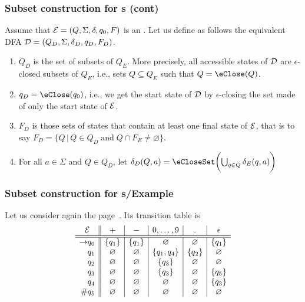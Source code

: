 % 
\begin{frame}
\frametitle{Subset construction for {\eNFA}s (cont)}

Assume that \({\cal E} = (Q, \Sigma, \delta, q_0, F)\) is an
\eNFA. Let us define as follows the equivalent DFA \({\cal D} = (Q_D,
\Sigma, \delta_D, q_D, F_D)\).
\begin{enumerate}

  \item \(Q_D\) is the set of subsets of \(Q_E\). More precisely, all
    accessible states of \(\cal D\) are \(\epsilon\)-closed subsets of
    \(Q_E\), i.e., sets \(Q \subseteq Q_E\) such that \(Q =
    \eClose(Q)\).

  \item \(q_D = \eClose (q_0)\), i.e., we get the start state
  of \(\cal D\) by \(\epsilon\)-closing the set made of only the start
  state of \(\cal E\).

  \item \(F_D\) is those sets of states that contain at least one
  final state of \(\cal E\), that is to say \(F_D = \{Q \, \lvert
  \, Q \in Q_D \; \text{and} \; Q \cap F_E \neq \varnothing\}\).

  \item For all \(a \in \Sigma\) and \(Q \in Q_D\), let
  \(
  \delta_D (Q, a) = \eCloseSet \biggl(\bigcup_{q \in Q}{\delta_E (q,
    a)}\biggr)
  \)

 \end{enumerate}

\end{frame}

% 
\begin{frame}
\frametitle{Subset construction for {\eNFA}s/Example}

Let us consider again the \eNFA page~\pageref{enfa_num}. Its transition
table is
\[
\begin{array}{r@{}l||c|c|c|c|c}
\multicolumn{2}{c||}{\cal E} & + & - & 0, \ldots, 9 & \mathtt{.} &
\epsilon\\
\hline\hline
\rightarrow & q_0 & \{q_1\} & \{q_1\} & \varnothing & \varnothing 
                  & \{q_1\}\\
            & q_1 & \varnothing  & \varnothing & \{q_1, q_4\} 
                  & \{q_2\} & \varnothing\\
            & q_2 & \varnothing  & \varnothing & \{q_3\} & \varnothing
                  & \varnothing\\
            & q_3 & \varnothing & \varnothing & \{q_3\} & \varnothing
                  & \{q_5\}\\
            & q_4 & \varnothing & \varnothing & \varnothing  
                  & \varnothing & \{q_3\}\\
         \# & q_5 & \varnothing & \varnothing & \varnothing 
                  & \varnothing & \varnothing 
\end{array}
\]

\end{frame}

